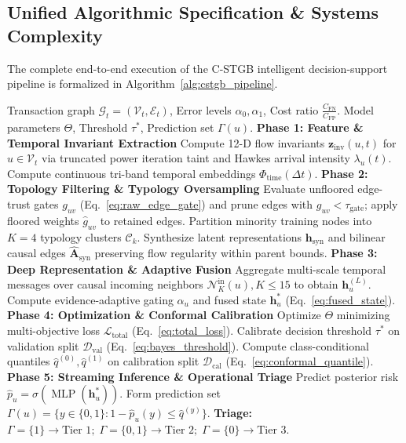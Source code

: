 \subsection{Unified Algorithmic Specification \& Systems Complexity}
\label{sec:algorithm_complexity}
The complete end-to-end execution of the C-STGB intelligent decision-support pipeline is formalized in Algorithm~\ref{alg:cstgb_pipeline}.

\begin{algorithm}[t]
\caption{C-STGB Unified Multi-Stage Pipeline}
\label{alg:cstgb_pipeline}
\footnotesize\linespread{0.90}\selectfont
\begin{algorithmic}[1]
\Require Transaction graph $\mathcal{G}_t=(\mathcal{V}_t, \mathcal{E}_t)$, Error levels $\alpha_0, \alpha_1$, Cost ratio $\frac{C_{\text{FN}}}{C_{\text{FP}}}$.
\Ensure Model parameters $\Theta$, Threshold $\tau^*$, Prediction set $\Gamma(u)$.
\State \textbf{Phase 1: Feature \& Temporal Invariant Extraction}
\State Compute 12-D flow invariants $\mathbf{z}_{\text{inv}}(u, t)$ for $u \in \mathcal{V}_t$ via truncated power iteration taint and Hawkes arrival intensity $\lambda_u(t)$.
\State Compute continuous tri-band temporal embeddings $\Phi_{\text{time}}(\Delta t)$.
\State \textbf{Phase 2: Topology Filtering \& Typology Oversampling}
\State Evaluate unfloored edge-trust gates $g_{uv}$ (Eq.~\ref{eq:raw_edge_gate}) and prune edges with $g_{uv} < \tau_{\text{gate}}$; apply floored weights $\hat{g}_{uv}$ to retained edges.
\State Partition minority training nodes into $K=4$ typology clusters $\mathcal{C}_k$.
\State Synthesize latent representations $\mathbf{h}_{\text{syn}}$ and bilinear causal edges $\hat{\mathbf{A}}_{\text{syn}}$ preserving flow regularity within parent bounds.
\State \textbf{Phase 3: Deep Representation \& Adaptive Fusion}
\State Aggregate multi-scale temporal messages over causal incoming neighbors $\mathcal{N}_K^{\text{in}}(u), K \le 15$ to obtain $\mathbf{h}_u^{(L)}$.
\State Compute evidence-adaptive gating $\alpha_u$ and fused state $\mathbf{h}_u^*$ (Eq.~\ref{eq:fused_state}).
\State \textbf{Phase 4: Optimization \& Conformal Calibration}
\State Optimize $\Theta$ minimizing multi-objective loss $\mathcal{L}_{\text{total}}$ (Eq.~\ref{eq:total_loss}).
\State Calibrate decision threshold $\tau^*$ on validation split $\mathcal{D}_{\text{val}}$ (Eq.~\ref{eq:bayes_threshold}).
\State Compute class-conditional quantiles $\hat{q}^{(0)}, \hat{q}^{(1)}$ on calibration split $\mathcal{D}_{\text{cal}}$ (Eq.~\ref{eq:conformal_quantile}).
\State \textbf{Phase 5: Streaming Inference \& Operational Triage}
\State Predict posterior risk $\hat{p}_u = \sigma(\operatorname{MLP}(\mathbf{h}_u^*))$.
\State Form prediction set $\Gamma(u) = \{y \in \{0, 1\} : 1 - \hat{p}_u(y) \le \hat{q}^{(y)}\}$.
\State \textbf{Triage:} $\Gamma=\{1\} \to \text{Tier 1}; \; \Gamma=\{0,1\} \to \text{Tier 2}; \; \Gamma=\{0\} \to \text{Tier 3}$.
\end{algorithmic}
\end{algorithm}

